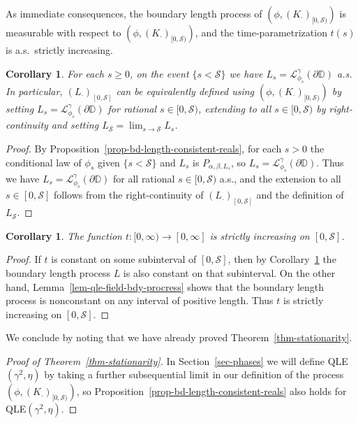 \documentclass[a4paper]{article}
\numberwithin{equation}{section}
\newcommand{\D}{\mathbb{D}}
\newcommand{\cL}{\mathcal{L}}
\newcommand{\qduration}{\mathcal{S}}
\newtheorem{corollary}[theorem]{Corollary}
\theoremstyle{remark}
\numberwithin{equation}{section}
\begin{document}
As immediate consequences, the boundary length process of $(\phi, (K_\cdot)_{[0, \qduration)})$ is measurable with respect to $(\phi, (K_\cdot)_{[0, \qduration)})$, and the time-parametrization $t(s)$ is a.s.\ strictly increasing.  

\begin{corollary}\label{cor-length-process}
For each $s \geq 0$, on the event $\{s < \qduration\}$ we have $L_s = \cL^\gamma_{\phi_s}(\partial \D)$ a.s. In particular, $(L_\cdot)_{[0, \qduration]}$ can be equivalently defined using $(\phi, (K_\cdot)_{[0, \qduration)})$ by setting $L_s = \cL^\gamma_{\phi_s}(\partial \D)$ for rational $s \in [0,\qduration)$,  extending to all $s \in [0,\qduration)$ by right-continuity and setting $L_\qduration = \lim_{s\to \qduration} L_s$. 
\end{corollary}
\begin{proof}
    By Proposition~\ref{prop-bd-length-consistent-reals}, for each $s > 0$ the conditional law of $\phi_s$ given $\{s < \qduration\}$ and $L_s$ is $P_{\alpha, \beta, L_s}$, so $L_s = \cL^\gamma_{\phi_s}(\partial \D)$. 
    Thus we have $L_s = \cL^\gamma_{\phi_s}(\partial \D)$ for all rational $s \in[0, \qduration)$ a.s., and the extension to all $s \in [0,\qduration]$ follows from the right-continuity of $(L_\cdot)_{[0,\qduration]}$ and the definition of $L_\qduration$.
\end{proof}

\begin{corollary}\label{cor-t-increasing}
The function $t: [0,\infty) \to [0,\infty]$ is strictly increasing on $[0,\qduration]$. 
\end{corollary}
\begin{proof}
    If $t$ is constant on some subinterval of $[0,\qduration]$, then by Corollary~\ref{cor-length-process} the boundary length process $L$ is also constant on that subinterval. On the other hand, Lemma~\ref{lem-qle-field-bdy-procress} shows that the boundary length process is nonconstant on any interval of positive length. Thus $t$ is strictly increasing on $[0,\qduration]$.
\end{proof}

We conclude by noting that we have already proved Theorem~\ref{thm-stationarity}. 
\begin{proof}[{Proof of Theorem~\ref{thm-stationarity}}]
    In Section~\ref{sec-phases} we will define QLE$(\gamma^2, \eta)$ by taking a further subsequential limit in our definition of the process $(\phi, (K_\cdot)_{[0,\qduration)})$, so  Proposition~\ref{prop-bd-length-consistent-reals} also holds for QLE$(\gamma^2, \eta)$.
\end{proof}
\end{document}
